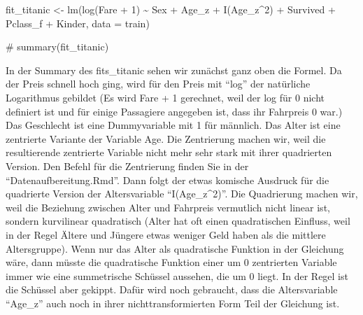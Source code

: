 \documentclass[
  10pt,
  letterpaper,
  a4paper, twoside]{scrreprt}
\newenvironment{Shaded}{\begin{snugshade}}{\end{snugshade}}
\newcommand{\AttributeTok}[1]{\textcolor[rgb]{0.40,0.45,0.13}{#1}}
\newcommand{\CommentTok}[1]{\textcolor[rgb]{0.37,0.37,0.37}{#1}}
\newcommand{\DecValTok}[1]{\textcolor[rgb]{0.68,0.00,0.00}{#1}}
\newcommand{\FunctionTok}[1]{\textcolor[rgb]{0.28,0.35,0.67}{#1}}
\newcommand{\NormalTok}[1]{\textcolor[rgb]{0.00,0.23,0.31}{#1}}
\newcommand{\OtherTok}[1]{\textcolor[rgb]{0.00,0.23,0.31}{#1}}
\newcommand{\SpecialCharTok}[1]{\textcolor[rgb]{0.37,0.37,0.37}{#1}}
\begin{document}
\begin{Shaded}
\begin{Highlighting}[]
\NormalTok{fit\_titanic }\OtherTok{\textless{}{-}} \FunctionTok{lm}\NormalTok{(}\FunctionTok{log}\NormalTok{(Fare }\SpecialCharTok{+} \DecValTok{1}\NormalTok{) }\SpecialCharTok{\textasciitilde{}} 
\NormalTok{                                  Sex }\SpecialCharTok{+}\NormalTok{ Age\_z }\SpecialCharTok{+} 
                                  \FunctionTok{I}\NormalTok{(Age\_z}\SpecialCharTok{\^{}}\DecValTok{2}\NormalTok{) }\SpecialCharTok{+} 
\NormalTok{                                  Survived }\SpecialCharTok{+}\NormalTok{ Pclass\_f }\SpecialCharTok{+} 
\NormalTok{                                  Kinder,}
                                   \AttributeTok{data =}\NormalTok{ train)}

\CommentTok{\# summary(fit\_titanic)}
\end{Highlighting}
\end{Shaded}

In der Summary des fits\_titanic sehen wir zunächst ganz oben die
Formel. Da der Preis schnell hoch ging, wird für den Preis mit
\enquote{log} der natürliche Logarithmus gebildet (Es wird Fare + 1
gerechnet, weil der log für 0 nicht definiert ist und für einige
Passagiere angegeben ist, dass ihr Fahrpreis 0 war.) Das Geschlecht ist
eine Dummyvariable mit 1 für männlich. Das Alter ist eine zentrierte
Variante der Variable Age. Die Zentrierung machen wir, weil die
resultierende zentrierte Variable nicht mehr sehr stark mit ihrer
quadrierten Version. Den Befehl für die Zentrierung finden Sie in der
\enquote{Datenaufbereitung.Rmd}. Dann folgt der etwas komische Ausdruck
für die quadrierte Version der Altersvariable \enquote{I(Age\_z\^{}2)}.
Die Quadrierung machen wir, weil die Beziehung zwischen Alter und
Fahrpreis vermutlich nicht linear ist, sondern kurvilinear quadratisch
(Alter hat oft einen quadratischen Einfluss, weil in der Regel Ältere
und Jüngere etwas weniger Geld haben als die mittlere Altersgruppe).
Wenn nur das Alter als quadratische Funktion in der Gleichung wäre, dann
müsste die quadratische Funktion einer um 0 zentrierten Variable immer
wie eine summetrische Schüssel aussehen, die um 0 liegt. In der Regel
ist die Schüssel aber gekippt. Dafür wird noch gebraucht, dass die
Altersvariable \enquote{Age\_z} auch noch in ihrer nichttransformierten
Form Teil der Gleichung ist.
\end{document}
